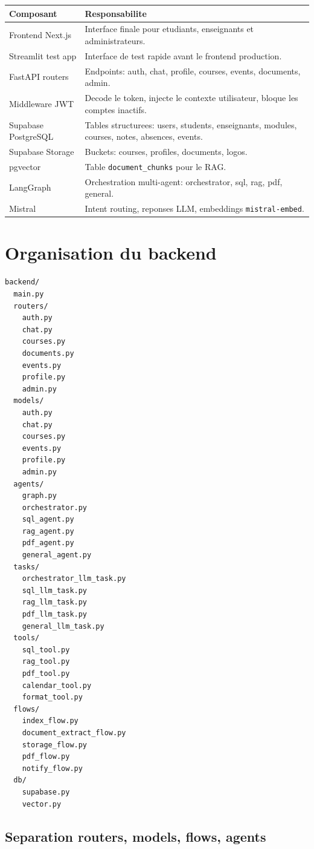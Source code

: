 \documentclass[11pt,a4paper]{article}
\begin{document}
\begin{longtable}{p{4cm}p{10cm}}
\toprule
\textbf{Composant} & \textbf{Responsabilite}\\
\midrule
Frontend Next.js & Interface finale pour etudiants, enseignants et administrateurs.\\
Streamlit test app & Interface de test rapide avant le frontend production.\\
FastAPI routers & Endpoints: auth, chat, profile, courses, events, documents, admin.\\
Middleware JWT & Decode le token, injecte le contexte utilisateur, bloque les comptes inactifs.\\
Supabase PostgreSQL & Tables structurees: users, students, enseignants, modules, courses, notes, absences, events.\\
Supabase Storage & Buckets: courses, profiles, documents, logos.\\
pgvector & Table \texttt{document\_chunks} pour le RAG.\\
LangGraph & Orchestration multi-agent: orchestrator, sql, rag, pdf, general.\\
Mistral & Intent routing, reponses LLM, embeddings \texttt{mistral-embed}.\\
\bottomrule
\end{longtable}

\section{Organisation du backend}

\begin{lstlisting}
backend/
  main.py
  routers/
    auth.py
    chat.py
    courses.py
    documents.py
    events.py
    profile.py
    admin.py
  models/
    auth.py
    chat.py
    courses.py
    events.py
    profile.py
    admin.py
  agents/
    graph.py
    orchestrator.py
    sql_agent.py
    rag_agent.py
    pdf_agent.py
    general_agent.py
  tasks/
    orchestrator_llm_task.py
    sql_llm_task.py
    rag_llm_task.py
    pdf_llm_task.py
    general_llm_task.py
  tools/
    sql_tool.py
    rag_tool.py
    pdf_tool.py
    calendar_tool.py
    format_tool.py
  flows/
    index_flow.py
    document_extract_flow.py
    storage_flow.py
    pdf_flow.py
    notify_flow.py
  db/
    supabase.py
    vector.py
\end{lstlisting}

\subsection{Separation routers, models, flows, agents}
\end{document}
